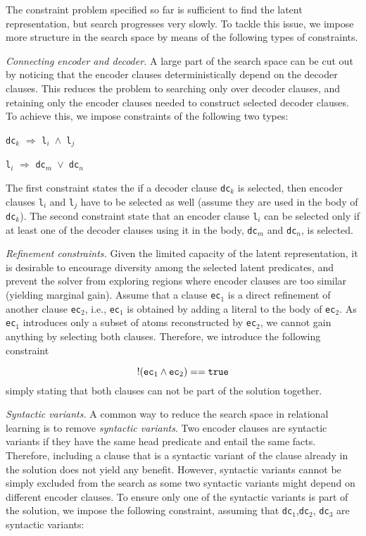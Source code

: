 The constraint problem specified so far is sufficient to find the latent representation, but search progresses very slowly.
To tackle this issue, we impose more structure in the search space by means of the following types of constraints.

\textit{Connecting encoder and decoder.}
A large part of the search space can be cut out by noticing that the encoder clauses deterministically depend on the decoder clauses.
This reduces the problem to searching only over decoder clauses, and retaining only the encoder clauses needed to construct selected decoder clauses.
To achieve this, we impose constraints of the following two types:
\begin{center}
	\texttt{dc}$_k$ $\Rightarrow$ \texttt{l$_i$ $\wedge$  l$_j$}

    \texttt{l}$_i$ $\Rightarrow$ \texttt{dc$_m$ $\vee$ dc$_n$}
\end{center}
The first constraint states the if a decoder clause \texttt{dc}$_k$ is selected, then encoder clauses \texttt{l$_i$} and \texttt{l$_j$} have to be selected as well (assume they are used in the body of \texttt{dc}$_k$).
The second constraint state that an encoder clause \texttt{l}$_i$ can be selected only if at least one of the decoder clauses using it in the body, \texttt{dc$_m$} and \texttt{dc$_n$}, is selected.


\textit{Refinement constraints.}
Given the limited capacity of the latent representation, it is desirable to encourage diversity among the selected latent predicates, and prevent the solver from exploring regions where encoder clauses are too similar (yielding marginal gain).
Assume that a clause \texttt{ec}$_1$ is a direct refinement of another clause \texttt{ec}$_2$, i.e., \texttt{ec}$_1$ is obtained by adding a literal to the body of \texttt{ec}$_2$.
As \texttt{ec}$_1$ introduces only a subset of atoms reconstructed by \texttt{ec}$_2$, we cannot gain anything by selecting both clauses.
Therefore, we introduce the following constraint

$$ !(\text{\texttt{ec}}_1 \wedge \text{\texttt{ec}}_2) == \text{\texttt{true}} $$
simply stating that both clauses can not be part of the solution together.



\textit{Syntactic variants.}
A common way to reduce the search space in relational learning is to remove \textit{syntactic variants}.
Two encoder clauses are syntactic variants if they have the same head predicate and entail the same facts.
Therefore, including a clause that is a syntactic variant of the clause already in the solution does not yield any benefit.
However, syntactic variants cannot be simply excluded from the search as some two syntactic variants might depend on different encoder clauses.
To ensure only one of the syntactic variants is part of the solution, we impose the following constraint, assuming that \texttt{dc}$_1$,\texttt{dc}$_2$, \texttt{dc}$_3$ are syntactic variants:

